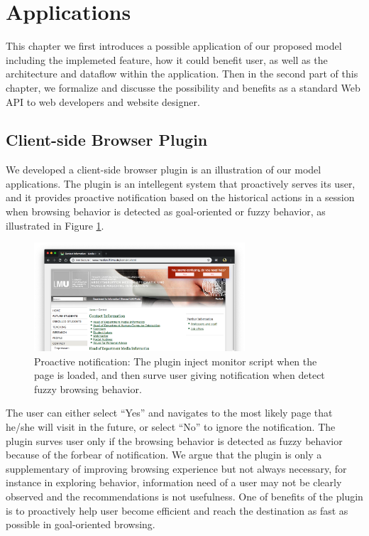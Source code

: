\section{Applications}
\label{ch:app}

This chapter we first introduces a possible application of our proposed model
including the implemeted feature, how it could benefit user, as well as the 
architecture and dataflow within the application.
Then in the second part of this chapter, we formalize and discusse 
the possibility and benefits as a standard Web API to web developers and website designer.

\subsection{Client-side Browser Plugin}
\label{sec:plugin}

We developed a client-side browser plugin is an illustration of our model applications.
The plugin is an intellegent system that proactively serves its user, 
and it provides proactive notification based on the historical actions in a session
when browsing behavior is detected as goal-oriented or fuzzy behavior, 
as illustrated in Figure \ref{fig:proactive-noti}.

\begin{figure}[H]
    \centering
    \includegraphics[width=0.7\textwidth]{figures/proactive-noti}
    \caption{Proactive notification:
    The plugin inject monitor script when the page is loaded, and then surve user giving
    notification when detect fuzzy browsing behavior.}
    \label{fig:proactive-noti}
\end{figure}

The user can either select ``Yes'' and navigates to the most likely page that he/she will visit
in the future, or select ``No'' to ignore the notification.
The plugin surves user only if the browsing behavior is detected as fuzzy behavior because
of the forbear of notification. We argue that the plugin is only a supplementary of improving
browsing experience but not always necessary, for instance in exploring behavior, information
need of a user may not be clearly observed and the recommendations is not usefulness. 
One of benefits of the plugin is to proactively help user become efficient
and reach the destination as fast as possible in goal-oriented browsing.

